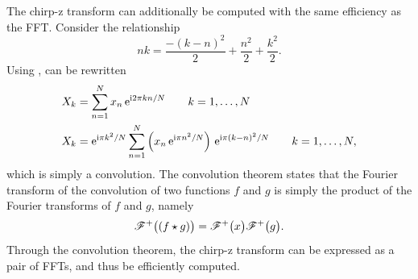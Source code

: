 The chirp-z transform can additionally be computed with the same efficiency
as the FFT\@.  Consider the relationship
\begin{equation}
  n k = \frac{-{(k-n)}^2}{2} + \frac{n^2}{2} + \frac{k^2}{2}.
  \label{eqn:relationshipfargodingus}
\end{equation}
Using ,  can be rewritten
\begin{align}
  X_k & = \sum_{n=1}^{N} x_n\, {\mathrm{e}}^{{\mathrm{i}} 2\pi k n/N} \qquad k=1,\ldots,N               \\
  X_k & = {\mathrm{e}}^{{\mathrm{i}} \pi k^2/N} \sum_{n=1}^{N} \left(x_n\, {\mathrm{e}}^{{\mathrm{i}} \pi n^2/N}\right)\,
  {\mathrm{e}}^{{\mathrm{i}} \pi{(k-n)}^2/N}\qquad k=1,\ldots,N,
\end{align}
which is simply a convolution.  The convolution theorem
states that the Fourier transform of the
convolution of two functions $f$ and $g$ is simply the product of the
Fourier transforms of $f$ and $g$, namely
\begin{equation}
  {\mathscr{F}^{+}\bigl(\left(f \star g\right)\bigr)} = {\mathscr{F}^{+}\bigl(x\bigr)}{\mathscr{F}^{+}\bigl(g\bigr)}.
\end{equation}
Through the convolution theorem, the chirp-z transform can be expressed as
a pair of FFTs, and thus be efficiently computed.
